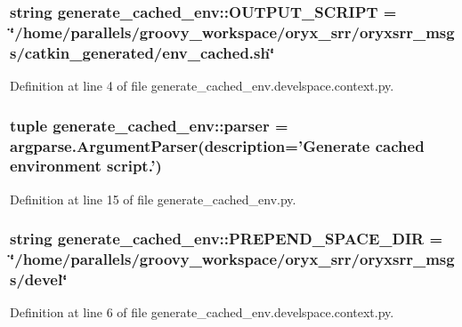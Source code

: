 \subsubsection[{\-O\-U\-T\-P\-U\-T\-\_\-\-S\-C\-R\-I\-P\-T}]{\setlength{\rightskip}{0pt plus 5cm}string {\bf generate\-\_\-cached\-\_\-env\-::\-O\-U\-T\-P\-U\-T\-\_\-\-S\-C\-R\-I\-P\-T} = \char`\"{}/home/parallels/groovy\-\_\-workspace/oryx\-\_\-srr/oryxsrr\-\_\-msgs/catkin\-\_\-generated/env\-\_\-cached.\-sh\char`\"{}}\label{namespacegenerate__cached__env_a2b990820565b508f09bdf4b646b41248}


\-Definition at line 4 of file generate\-\_\-cached\-\_\-env.\-develspace.\-context.\-py.

\subsubsection[{parser}]{\setlength{\rightskip}{0pt plus 5cm}tuple {\bf generate\-\_\-cached\-\_\-env\-::parser} = argparse.\-Argument\-Parser(description='\-Generate cached environment script.')}\label{namespacegenerate__cached__env_adc7207f2d17ca27671a8a3a61ddbe3b1}


\-Definition at line 15 of file generate\-\_\-cached\-\_\-env.\-py.

\subsubsection[{\-P\-R\-E\-P\-E\-N\-D\-\_\-\-S\-P\-A\-C\-E\-\_\-\-D\-I\-R}]{\setlength{\rightskip}{0pt plus 5cm}string {\bf generate\-\_\-cached\-\_\-env\-::\-P\-R\-E\-P\-E\-N\-D\-\_\-\-S\-P\-A\-C\-E\-\_\-\-D\-I\-R} = \char`\"{}/home/parallels/groovy\-\_\-workspace/oryx\-\_\-srr/oryxsrr\-\_\-msgs/devel\char`\"{}}\label{namespacegenerate__cached__env_adf2800a5704edaa58431a0f1c5704a4f}


\-Definition at line 6 of file generate\-\_\-cached\-\_\-env.\-develspace.\-context.\-py.

